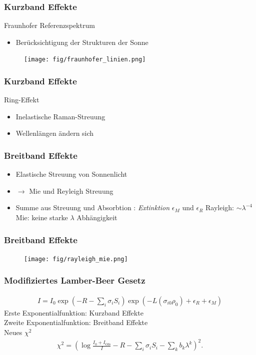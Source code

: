 \documentclass{beamer}
\begin{document}
\begin{frame}
    \frametitle{Kurzband Effekte}
	Fraunhofer Referenzspektrum
    \begin{itemize}
        \item Berücksichtigung der Strukturen der Sonne
    \end{itemize}
    \begin{figure}[h]
        \texttt{[image: fig/fraunhofer\_linien.png]}
    \end{figure}
\end{frame}

\begin{frame}
	\frametitle{Kurzband Effekte}
    Ring-Effekt
    \begin{itemize}
        \item Inelastische Raman-Streuung
        \item Wellenlängen ändern sich
    \end{itemize}
\end{frame}

\begin{frame}
    \frametitle{Breitband Effekte}
    \begin{itemize}
        \item Elastische Streuung von Sonnenlicht 
        \item $\to$ Mie und Reyleigh Streuung
        \item Summe aus Streuung und Absorbtion : \textit{Extinktion} $\epsilon_M$ und $\epsilon_R$
    Rayleigh: $\sim \lambda^{-4}$\\
    Mie: keine starke $\lambda$ Abhängigkeit
    \end{itemize}
\end{frame}

\begin{frame}
    \frametitle{Breitband Effekte}
    \begin{figure}
    	\texttt{[image: fig/rayleigh\_mie.png]}
    \end{figure}
\end{frame}


\begin{frame}
    \frametitle{Modifiziertes Lamber-Beer Gesetz}
    \begin{align}
        I = I_0 \exp(-R - \sum_i \sigma_i S_i) \exp\left(-L (\sigma_{i0}\rho_0) + \epsilon_R + \epsilon_M\right)
    \end{align}
    Erste Exponentialfunktion: Kurzband Effekte\\
    Zweite Exponentialfunktion: Breitband Effekte\\
    \pause
    Neues $\chi^2$
    \begin{align}
        \chi^2 = \left( \log\frac{I_0 + I_\text{Ofs}}{I} - R - \sum_i \sigma_i S_i - \sum_k b_k \lambda^k \right)^2.
    \end{align}
\end{frame}
\end{document}
